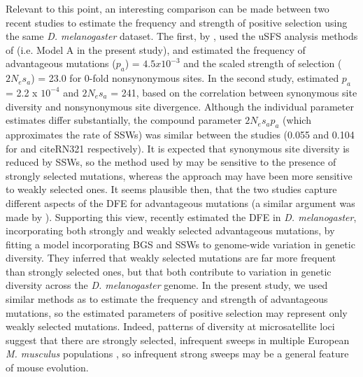 	Relevant to this point, an interesting comparison can be made between two recent studies to estimate the frequency and strength of positive selection using the same \textit{D. melanogaster} dataset. The first, by \cite{RN321}, used the uSFS analysis methods of \cite{RN210} (i.e. Model A in the present study), and estimated the frequency of advantageous mutations ($p_a$) = $4.5 x 10^{-3}$ and the scaled strength of selection ($2N_es_a$) = 23.0 for 0-fold nonsynonymous sites. In the second study,  \cite{RN290} estimated $p_a$ = 2.2 x $10^{-4}$ and $2N_es_a$ = 241, based on the correlation between synonymous site diversity and nonsynonymous site divergence. Although the individual parameter estimates differ substantially, the compound parameter $2N_es_ap_a$ (which approximates the rate of SSWs) was similar between the studies (0.055 and 0.104 for \cite{RN290} and cite{RN321} respectively). It is expected that synonymous site diversity is reduced by SSWs, so the method used by \cite{RN290} may be sensitive to the presence of strongly selected mutations, whereas the \cite{RN321} approach may have been more sensitive to weakly selected ones. It seems plausible then, that the two studies capture different aspects of the DFE for advantageous mutations (a similar argument was made by \citealt{RN171}). Supporting this view, \cite{RN274} recently estimated the DFE in \textit{D. melanogaster}, incorporating both strongly and weakly selected advantageous mutations, by fitting a model incorporating BGS and SSWs to genome-wide variation in genetic diversity. They inferred that weakly selected mutations are far more frequent than strongly selected ones, but that both contribute to variation in genetic diversity across the \textit{D. melanogaster} genome. In the present study, we used similar methods as \cite{RN321} to estimate the frequency and strength of advantageous mutations, so the estimated parameters of positive selection may represent only weakly selected mutations. Indeed, patterns of diversity at microsatellite loci suggest that there are strongly selected, infrequent sweeps in multiple European \textit{M. musculus} populations \citep{RN355}, so infrequent strong sweeps may be a general feature of mouse evolution.

